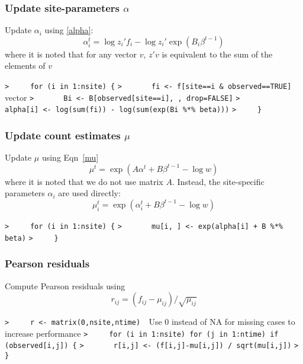 \documentclass[a4paper]{article}
\begin{document}
\subsubsection{Update site-parameters $\alpha$}
Update $\alpha_i$ using \eqref{alpha}:
$$ \alpha_i^t = \log z_i' f_i - \log z_i' \exp(B_i \beta^{t-1}) $$
where it is noted that for any vector $v$, $z' v$ is equivalent to the sum of the elements of $v$\par
\verb~>     for (i in 1:nsite) {~\newline
\verb~>       fi <- f[site==i & observed==TRUE]  ~{\sffamily vector}\newline
\verb~>       Bi <- B[observed[site==i], , drop=FALSE]~\newline
\verb~>       alpha[i] <- log(sum(fi)) - log(sum(exp(Bi %*% beta)))~\newline
\verb~>     }~\par



\subsubsection{Update count estimates $\mu$}
Update $\mu$ using Eqn~\eqref{mu}
$$ \mu^t = \exp(A\alpha^t + B\beta^{t-1} - \log w) $$
where it is noted that we do not use matrix $A$. Instead, the site-specific
parameters $\alpha_i$ are used directly:
$$ \mu_i^t = \exp(\alpha_i^t + B\beta^{t-1} - \log w) $$\par
\verb~>     for (i in 1:nsite) {~\newline
\verb~>       mu[i, ] <- exp(alpha[i] + B %*% beta)~\newline
\verb~>     }~\par



\subsubsection{Pearson residuals}
Compute Pearson residuals using
\begin{equation}
  r_{ij} = (f_{ij} - \mu_{ij}) / \sqrt{\mu_{ij}}
\end{equation}\par
\verb~>     r <- matrix(0,nsite,ntime)  ~{\sffamily Use 0 instead of NA for missing cases to increase performance}\newline
\verb~>     for (i in 1:nsite) for (j in 1:ntime) if (observed[i,j]) {~\newline
\verb~>       r[i,j] <- (f[i,j]-mu[i,j]) / sqrt(mu[i,j])~\newline
\verb~>     }~\par
\end{document}
